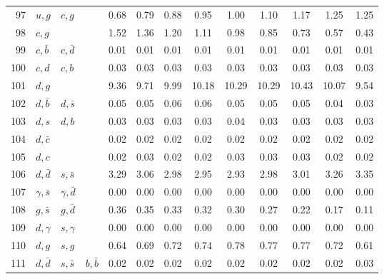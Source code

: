 \begin{tabularx}{\textwidth}{rXXX@{}S@{}S@{}S@{}S@{}S@{}S@{}S@{}S@{}S}
 97 & $u, g$           & $c, g$            &                  &  0.68 &  0.79 &  0.88 &  0.95 &  1.00 &  1.10 &  1.17 &  1.25 &  1.25 \\
 98 & $c, g$           &                   &                  &  1.52 &  1.36 &  1.20 &  1.11 &  0.98 &  0.85 &  0.73 &  0.57 &  0.43 \\
 99 & $c, \bar b$      & $c, \bar d$       &                  &  0.01 &  0.01 &  0.01 &  0.01 &  0.01 &  0.01 &  0.01 &  0.01 &  0.01 \\
100 & $c, d$           & $c, b$            &                  &  0.03 &  0.03 &  0.03 &  0.03 &  0.03 &  0.03 &  0.03 &  0.03 &  0.03 \\
101 & $d, g$           &                   &                  &  9.36 &  9.71 &  9.99 & 10.18 & 10.29 & 10.29 & 10.43 & 10.07 &  9.54 \\
102 & $d, \bar b$      & $d, \bar s$       &                  &  0.05 &  0.05 &  0.06 &  0.06 &  0.05 &  0.05 &  0.05 &  0.04 &  0.03 \\
103 & $d, s$           & $d, b$            &                  &  0.03 &  0.03 &  0.03 &  0.03 &  0.04 &  0.03 &  0.03 &  0.03 &  0.03 \\
104 & $d, \bar c$      &                   &                  &  0.02 &  0.02 &  0.02 &  0.02 &  0.02 &  0.02 &  0.02 &  0.02 &  0.02 \\
105 & $d, c$           &                   &                  &  0.02 &  0.03 &  0.02 &  0.02 &  0.03 &  0.03 &  0.03 &  0.02 &  0.02 \\
106 & $d, \bar d$      & $s, \bar s$       &                  &  3.29 &  3.06 &  2.98 &  2.95 &  2.93 &  2.98 &  3.01 &  3.26 &  3.35 \\
107 & $\gamma, \bar s$ & $\gamma, \bar d$  &                  &  0.00 &  0.00 &  0.00 &  0.00 &  0.00 &  0.00 &  0.00 &  0.00 &  0.00 \\
108 & $g, \bar s$      & $g, \bar d$       &                  &  0.36 &  0.35 &  0.33 &  0.32 &  0.30 &  0.27 &  0.22 &  0.17 &  0.11 \\
109 & $d, \gamma$      & $s, \gamma$       &                  &  0.00 &  0.00 &  0.00 &  0.00 &  0.00 &  0.00 &  0.00 &  0.00 &  0.00 \\
110 & $d, g$           & $s, g$            &                  &  0.64 &  0.69 &  0.72 &  0.74 &  0.78 &  0.77 &  0.77 &  0.72 &  0.61 \\
111 & $d, \bar d$      & $s, \bar s$       & $b, \bar b$      &  0.02 &  0.02 &  0.02 &  0.02 &  0.02 &  0.02 &  0.02 &  0.02 &  0.03 \\

\end{tabularx}
